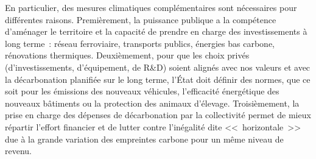 \documentclass[a5paper,french]{memoir}
\begin{document}
En particulier, des mesures climatiques complémentaires sont nécessaires pour différentes raisons. Premièrement, la puissance publique a la compétence d'aménager le territoire et la capacité de prendre en charge des investissements à long terme~: réseau ferroviaire, transports publics, énergies bas carbone, rénovations thermiques. Deuxièmement, pour que les choix privés (d'investissements, d'équipement, de R\&D) soient alignés avec nos valeurs et avec la décarbonation planifiée sur le long terme, l'État doit définir des normes, que ce soit pour les émissions des nouveaux véhicules, l'efficacité énergétique des nouveaux bâtiments ou la protection des animaux d'élevage. Troisièmement, la prise en charge des dépenses de décarbonation par la collectivité permet de mieux répartir l'effort financier et de lutter contre l'inégalité dite <<~horizontale~>> due à la grande variation des empreintes carbone pour un même niveau de revenu. %
\end{document}
